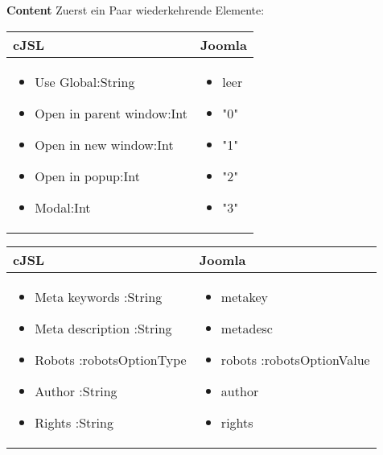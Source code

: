 \textbf{Content}
Zuerst ein Paar wiederkehrende Elemente:

\begin{minipage}{0.7\textwidth}
\begin{tabular}{|p{} | p{}|}
\hline
\textbf{cJSL} & \textbf{Joomla} \\ 
\hline
\begin{itemize}
\item Use Global:String
\item Open in parent window:Int
\item Open in new window:Int
\item Open in popup:Int
\item Modal:Int 
\end{itemize}
 & 
\begin{itemize}
\item leer 
\item "0"
\item "1"
\item "2"
\item "3"
\end{itemize}
\\
\hline
\end{tabular}
\end{minipage}

\begin{minipage}{0.7\textwidth}
\begin{tabular}{|p{} | p{}|}
\hline
\textbf{cJSL} & \textbf{Joomla} \\ 
\hline
\begin{itemize}
 \item Meta keywords :String 
 \item Meta description :String
 \item Robots :robotsOptionType 
 \item Author :String 
 \item Rights :String 
\end{itemize}
 & 
\begin{itemize}
\item metakey 
\item metadesc 
\item robots :robotsOptionValue 
\item author 
\item rights 
\end{itemize}
\\
\hline
\end{tabular}
\end{minipage}

